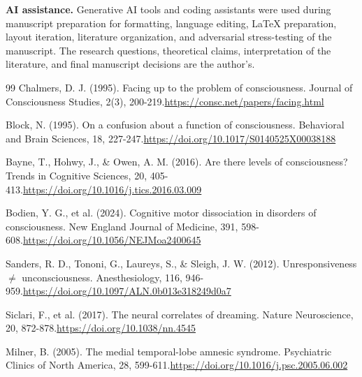 \documentclass[11pt,letterpaper]{article}
\begin{document}
{\small\textbf{AI assistance.} Generative AI tools and coding assistants were used during manuscript preparation for formatting, language editing, LaTeX preparation, layout iteration, literature organization, and adversarial stress-testing of the manuscript. The research questions, theoretical claims, interpretation of the literature, and final manuscript decisions are the author's.\par}

\begin{thebibliography}{99}
\scriptsize
\setlength{\itemsep}{0em}
\setlength{\parsep}{0pt}
 Chalmers, D. J. (1995). Facing up to the problem of consciousness. Journal of Consciousness Studies, 2(3), 200-219.\newline \href{https://consc.net/papers/facing.html}{https://consc.net/papers/facing.html}

 Block, N. (1995). On a confusion about a function of consciousness. Behavioral and Brain Sciences, 18, 227-247.\newline \href{https://doi.org/10.1017/S0140525X00038188}{https://doi.org/10.1017/S0140525X00038188}

 Bayne, T., Hohwy, J., \& Owen, A. M. (2016). Are there levels of consciousness? Trends in Cognitive Sciences, 20, 405-413.\newline \href{https://doi.org/10.1016/j.tics.2016.03.009}{https://doi.org/10.1016/j.tics.2016.03.009}

 Bodien, Y. G., et al. (2024). Cognitive motor dissociation in disorders of consciousness. New England Journal of Medicine, 391, 598-608.\newline \href{https://doi.org/10.1056/NEJMoa2400645}{https://doi.org/10.1056/NEJMoa2400645}

 Sanders, R. D., Tononi, G., Laureys, S., \& Sleigh, J. W. (2012). Unresponsiveness \ensuremath{\neq} unconsciousness. Anesthesiology, 116, 946-959.\newline \href{https://doi.org/10.1097/ALN.0b013e318249d0a7}{https://doi.org/10.1097/ALN.0b013e318249d0a7}

 Siclari, F., et al. (2017). The neural correlates of dreaming. Nature Neuroscience, 20, 872-878.\newline \href{https://doi.org/10.1038/nn.4545}{https://doi.org/10.1038/nn.4545}

 Milner, B. (2005). The medial temporal-lobe amnesic syndrome. Psychiatric Clinics of North America, 28, 599-611.\newline \href{https://doi.org/10.1016/j.psc.2005.06.002}{https://doi.org/10.1016/j.psc.2005.06.002}


\end{thebibliography}
\end{document}
